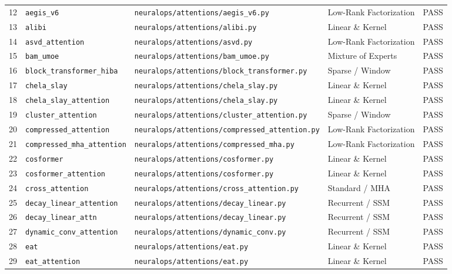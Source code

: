 \begin{center}
\begin{longtable}{rllll}
12 & \texttt{aegis\_v6} & \texttt{neuralops/attentions/aegis\_v6.py} & Low-Rank Factorization & PASS \\
13 & \texttt{alibi} & \texttt{neuralops/attentions/alibi.py} & Linear \& Kernel & PASS \\
14 & \texttt{asvd\_attention} & \texttt{neuralops/attentions/asvd.py} & Low-Rank Factorization & PASS \\
15 & \texttt{bam\_umoe} & \texttt{neuralops/attentions/bam\_umoe.py} & Mixture of Experts & PASS \\
16 & \texttt{block\_transformer\_hiba} & \texttt{neuralops/attentions/block\_transformer.py} & Sparse / Window & PASS \\
17 & \texttt{chela\_slay} & \texttt{neuralops/attentions/chela\_slay.py} & Linear \& Kernel & PASS \\
18 & \texttt{chela\_slay\_attention} & \texttt{neuralops/attentions/chela\_slay.py} & Linear \& Kernel & PASS \\
19 & \texttt{cluster\_attention} & \texttt{neuralops/attentions/cluster\_attention.py} & Sparse / Window & PASS \\
20 & \texttt{compressed\_attention} & \texttt{neuralops/attentions/compressed\_attention.py} & Low-Rank Factorization & PASS \\
21 & \texttt{compressed\_mha\_attention} & \texttt{neuralops/attentions/compressed\_mha.py} & Low-Rank Factorization & PASS \\
22 & \texttt{cosformer} & \texttt{neuralops/attentions/cosformer.py} & Linear \& Kernel & PASS \\
23 & \texttt{cosformer\_attention} & \texttt{neuralops/attentions/cosformer.py} & Linear \& Kernel & PASS \\
24 & \texttt{cross\_attention} & \texttt{neuralops/attentions/cross\_attention.py} & Standard / MHA & PASS \\
25 & \texttt{decay\_linear\_attention} & \texttt{neuralops/attentions/decay\_linear.py} & Recurrent / SSM & PASS \\
26 & \texttt{decay\_linear\_attn} & \texttt{neuralops/attentions/decay\_linear.py} & Recurrent / SSM & PASS \\
27 & \texttt{dynamic\_conv\_attention} & \texttt{neuralops/attentions/dynamic\_conv.py} & Recurrent / SSM & PASS \\
28 & \texttt{eat} & \texttt{neuralops/attentions/eat.py} & Linear \& Kernel & PASS \\
29 & \texttt{eat\_attention} & \texttt{neuralops/attentions/eat.py} & Linear \& Kernel & PASS \\

\end{longtable}
\end{center}
